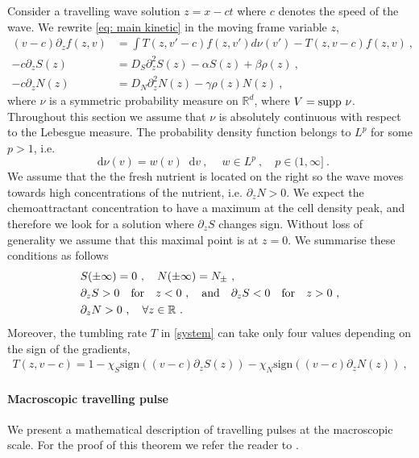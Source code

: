 \documentclass[11pt,twoside]{article}
\newcommand*\diff{\mathop{}\!\mathrm{d}}
\theoremstyle{plain}
\theoremstyle{nonumberplain}
\begin{document}
Consider a travelling wave solution $z=x-ct$ where $c$ denotes the speed of the wave. We rewrite \eqref{eq: main kinetic} in the moving frame variable $z$,
\begin{equation}
\begin{aligned}\label{system}
(v-c)\partial_zf(z,v)&=\int T(z,v'-c)f(z,v')d\nu(v')-T(z,v-c)f(z,v)\ ,\\
-c\partial_z S(z)&=D_S\partial_{z}^2S(z)-\alpha S(z)+\beta \rho(z)\ ,\\
-c\partial_zN(z)&=D_N\partial_{z}^2N(z)-\gamma\rho(z) N(z)
\ ,
\end{aligned}
\end{equation}
where $\nu$ is a symmetric probability measure on $\mathbb{R}^d$, where $V=\textnormal{supp}\ \nu$. Throughout this section we assume that $\nu$ is absolutely continuous with respect to the Lebesgue measure. The probability density function belongs to $L^p$ for some $p > 1$, i.e.
\[
\diff \nu (v)=w(v)\diff v\ ,\ \quad w\in L^p\ , \quad p\in(1,\infty]\ .
\]
We assume that the the fresh nutrient is located on the right so the wave moves towards high concentrations of the nutrient, i.e.  $\partial_zN>0$. We expect the chemoattractant concentration to have a maximum at the cell density peak, and therefore we look for a solution where  $\partial_zS$ changes sign. Without loss of generality we assume that this maximal point is at $z=0$.  We summarise these conditions as follows
\begin{equation}
\begin{aligned}
 &S(\pm \infty)=0\ ,\quad N(\pm\infty)=N_\pm\ ,\\
&\partial_z S>0  \quad  \textrm{for}\quad z<0\ , \quad\textnormal{and}\quad\partial_z S<0 \quad \textrm{for}\quad z>0\ ,\\
&\partial_zN>0\ ,\quad\forall z\in\mathbb{R}\ .\label{eq: cond chemicals}
\end{aligned}
\end{equation}
Moreover, the tumbling rate $T$ in \eqref{system} can take only four values depending on the sign of the gradients,
\begin{eqnarray}\label{tumbl}
   T(z,v-c)=1-\chi_S \textrm{sign}((v-c)\partial_z S(z))-\chi_N \textrm{sign}((v-c)\partial_z N(z))\ ,
\end{eqnarray}

\paragraph{Macroscopic travelling pulse}
We present a mathematical description of travelling pulses at the macroscopic scale. For the proof of this theorem we refer the reader to \cite{calvez2016chemotactic}.
\end{document}
